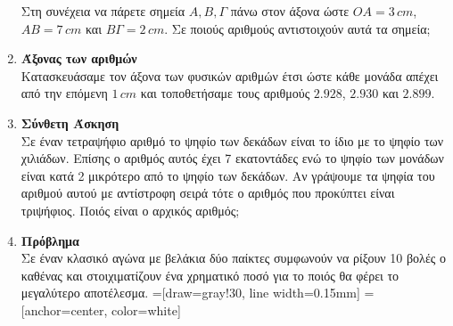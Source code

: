 \documentclass[twoside,nofonts,internet]{askhseis}
\newcommand{\tss}[1]{\textsuperscript{#1}}
\begin{document}
\begin{enumerate}[itemsep=5mm]
\begin{center}
\end{center}
Στη συνέχεια να πάρετε σημεία $ A,B,\varGamma $ πάνω στον άξονα ώστε $ OA=3\,cm $, $ AB=7\,cm $ και $ B\varGamma=2\,cm $. Σε ποιούς αριθμούς αντιστοιχούν αυτά τα σημεία;
\item \textbf{Άξονας των αριθμών}\\
Κατασκευάσαμε τον άξονα των φυσικών αριθμών έτσι ώστε κάθε μονάδα απέχει από την επόμενη $ 1\,cm $ και τοποθετήσαμε τους αριθμούς $ 2.928 $, $ 2.930 $ και $ 2.899 $.
\item \textbf{Σύνθετη Άσκηση}\\
Σε έναν τετραψήφιο αριθμό το ψηφίο των δεκάδων είναι το ίδιο με το ψηφίο των χιλιάδων. Επίσης ο αριθμός αυτός έχει 7 εκατοντάδες ενώ το ψηφίο των μονάδων είναι κατά 2 μικρότερο από το ψηφίο των δεκάδων. Αν γράψουμε τα ψηφία του αριθμού αυτού με αντίστροφη σειρά τότε ο αριθμός που προκύπτει είναι τριψήφιος. Ποιός είναι ο αρχικός αριθμός;
\item \textbf{Πρόβλημα}\\
Σε έναν κλασικό αγώνα με βελάκια δύο παίκτες συμφωνούν να ρίξουν 10 βολές ο καθένας και στοιχιματίζουν ένα χρηματικό ποσό για το ποιός θα φέρει το μεγαλύτερο αποτέλεσμα.
=[draw=gray!30, line width=0.15mm]
=[anchor=center, color=white]

\newcommand{\strip}[4]{
	\filldraw[#1, wired]
	({18 *  #2}      :                   #3) arc
	({18 *  #2}      : {18 * (#2 + 1)} : #3) --
	({18 * (#2 + 1)} :                   #4) arc
	({18 * (#2 + 1)} : {18 *  #2}      : #4) -- cycle;
}

\newcommand{\sector}[3]{
	\filldraw[#1, wired]
	(0, 0) --
	({18 * #2} :                   #3) arc
	({18 * #2} : {18 * (#2 + 1)} : #3) -- cycle;
}


\begin{center}
	\begin{tikzpicture}[rotate=81, scale=.09]


\end{tikzpicture}
\end{center}
\end{enumerate}
\end{document}
